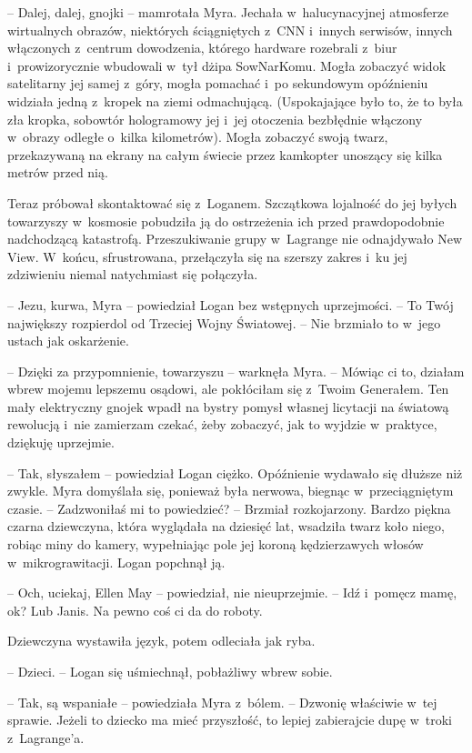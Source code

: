 \documentclass[oneside,polish,11pt,sfheadings]{mwbk}
\begin{document}
-- Dalej, dalej, gnojki -- mamrotała Myra. Jechała w~halucynacyjnej
atmosferze wirtualnych obrazów, niektórych ściągniętych z~CNN i~innych
serwisów, innych włączonych z~centrum dowodzenia, którego hardware
rozebrali z~biur i~prowizorycznie wbudowali w~tył dżipa SowNarKomu.
Mogła zobaczyć widok satelitarny jej samej z~góry, mogła pomachać i~po
sekundowym opóźnieniu widziała jedną z~kropek na ziemi odmachującą.
(Uspokajające było to, że to była zła kropka, sobowtór hologramowy jej i~jej otoczenia bezbłędnie włączony w~obrazy odległe o~kilka kilometrów).
Mogła zobaczyć swoją twarz, przekazywaną na ekrany na całym świecie
przez kamkopter unoszący się kilka metrów przed nią.

Teraz próbował skontaktować się z~Loganem. Szczątkowa lojalność do jej
byłych towarzyszy w~kosmosie pobudziła ją do ostrzeżenia ich przed
prawdopodobnie nadchodzącą katastrofą. Przeszukiwanie grupy w~Lagrange
nie odnajdywało New View. W~końcu, sfrustrowana, przełączyła się na
szerszy zakres i~ku jej zdziwieniu niemal natychmiast się połączyła.

-- Jezu, kurwa, Myra -- powiedział Logan bez wstępnych uprzejmości. -- To
Twój największy rozpierdol od Trzeciej Wojny Światowej. -- Nie brzmiało
to w~jego ustach jak oskarżenie.

-- Dzięki za przypomnienie, towarzyszu -- warknęła Myra. -- Mówiąc ci to,
działam wbrew mojemu lepszemu osądowi, ale pokłóciłam się z~Twoim
Generałem. Ten mały elektryczny gnojek wpadł na bystry pomysł własnej
licytacji na światową rewolucją i~nie zamierzam czekać, żeby zobaczyć,
jak to wyjdzie w~praktyce, dziękuję uprzejmie.

-- Tak, słyszałem -- powiedział Logan ciężko. Opóźnienie wydawało się
dłuższe niż zwykle. Myra domyślała się, ponieważ była nerwowa, biegnąc w~przeciągniętym czasie. -- Zadzwoniłaś mi to powiedzieć? -- Brzmiał
rozkojarzony. Bardzo piękna czarna dziewczyna, która wyglądała na
dziesięć lat, wsadziła twarz koło niego, robiąc miny do kamery,
wypełniając pole jej koroną kędzierzawych włosów w~mikrograwitacji.
Logan popchnął ją.

-- Och, uciekaj, Ellen May -- powiedział, nie nieuprzejmie. -- Idź i~pomęcz
mamę, ok? Lub Janis. Na pewno coś ci da do roboty.

Dziewczyna wystawiła język, potem odleciała jak ryba.

-- Dzieci. -- Logan się uśmiechnął, pobłażliwy wbrew sobie.

-- Tak, są wspaniałe -- powiedziała Myra z~bólem. -- Dzwonię właściwie w~tej sprawie. Jeżeli to dziecko ma mieć przyszłość, to lepiej zabierajcie
dupę w~troki z~Lagrange'a.
\end{document}
